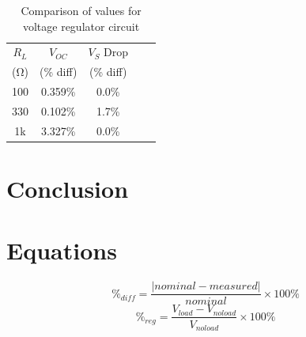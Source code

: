 \documentclass{article}
\begin{document}
\begin{table}
  \centering
  \begin{tabular}{ccccc}
    $R_L$ & $V_{OC}$ & $V_S$ Drop \\
    (\si{\ohm}) & (\% diff) & (\% diff) \\
    \hline
    100 & 0.359\% & 0.0\% \\
    330 & 0.102\% & 1.7\% \\
    1k & 3.327\% & 0.0\% \\
  \end{tabular}
  \caption{\label{tab:volt_reg_diff} Comparison of values for voltage regulator circuit}
\end{table}

\section{Conclusion}
\label{sec:conclusion}


\section{Equations}
\label{sec:equations}

%
\begin{equation}
  \label{eq:percent_diff}
  \%_{diff} = \frac{|nominal - measured|}{nominal}\times 100\%
\end{equation}
%
\begin{equation}
  \label{eq:volt_reg}
  \%_{reg} = \frac{V_{load} - V_{no load}}{V_{no load}}\times 100\%
\end{equation}
\end{document}
